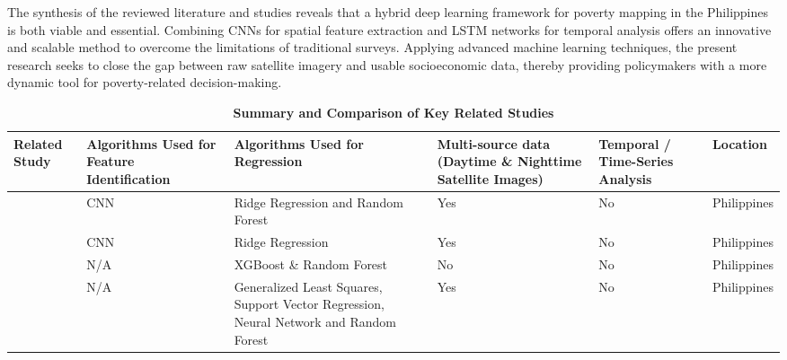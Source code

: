 \documentclass[12pt, letterpaper]{article}
\numberwithin{figure}{section}
\numberwithin{table}{section}
\begin{document}
The synthesis of the reviewed literature and studies reveals that a
hybrid deep learning framework for poverty mapping in the Philippines
is both viable and essential. Combining CNNs for spatial feature
extraction and LSTM networks for temporal analysis offers an
innovative and scalable method to overcome the limitations of
traditional surveys. Applying advanced machine learning techniques,
the present research seeks to close the gap between raw satellite
imagery and usable socioeconomic data, thereby providing policymakers
with a more dynamic tool for poverty-related decision-making.

\begin{table}[htbp]
  \centering
  \caption[Summary and comparison of key related
  studies]{\textbf{Summary and Comparison of Key Related Studies}}
  \label{tab:related_studies}
  \small
  \renewcommand{\arraystretch}{1.15} %

  \begin{tabularx}{\textwidth}{|
      >{\raggedright\arraybackslash}p{2.5cm}|
      >{\raggedright\arraybackslash}p{2.5cm}|
      >{\raggedright\arraybackslash}p{2cm}|
      >{\raggedright\arraybackslash}X|
      >{\raggedright\arraybackslash}X|
    >{\raggedright\arraybackslash}X|}
    \hline

    \rowcolor[gray]{0.9}
    \textbf{Related Study} &
    \textbf{Algorithms Used for Feature Identification} &
    \textbf{Algorithms Used for Regression} &
    \textbf{Multi-source data (Daytime \& Nighttime Satellite Images)} &
    \textbf{Temporal / Time-Series Analysis} &
    \textbf{Location} \\ \hline

    \textcite{ADB2021} &
    CNN & Ridge Regression and Random Forest &
    Yes  & No & Philippines \\ \hline

    \textcite{Tingzon2019} &
    CNN & Ridge Regression &
    Yes & No & Philippines \\ \hline

    \textcite{Ledesma2020} &
    N/A & XGBoost \& Random Forest &
    No & No & Philippines \\ \hline

    \textcite{Jimenez2025} &
    N/A & Generalized Least Squares, Support Vector Regression,
    Neural Network and Random Forest &
    Yes & No & Philippines \\ \hline


\end{tabularx}
\end{table}
\end{document}
